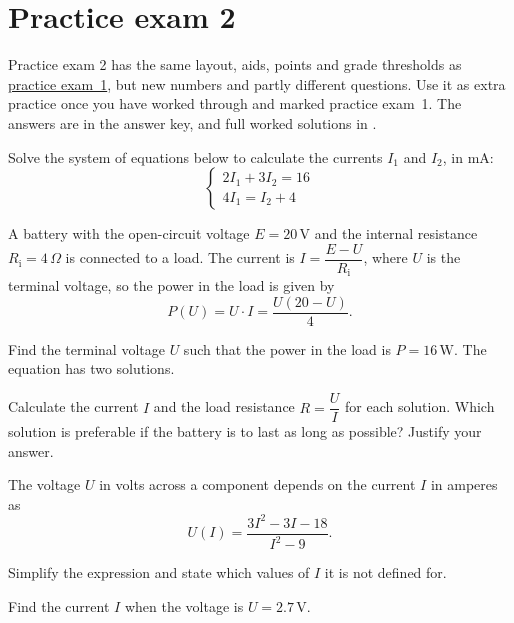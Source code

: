 
\section{Practice exam 2}
\label{c19:sec:ovningstentamen2}
Practice exam 2 has the same layout, aids, points and grade thresholds as
\hyperref[c19:sec:ovningstentamen]{practice exam~1}, but new numbers and partly different
questions. Use it as extra practice once you have worked through and marked practice exam~1. The
answers are in the answer key, and full worked solutions in .


Solve the system of equations below to calculate the currents $I_1$ and $I_2$, in mA:
\[
  \begin{cases}
    2I_1 + 3I_2 = 16 \\
    4I_1 = I_2 + 4
  \end{cases}
\]

A battery with the open-circuit voltage $E = 20\,\text{V}$ and the internal resistance
$R_{\text{i}} = 4\,\Omega$ is connected to a load. The current is
$I = \dfrac{E - U}{R_{\text{i}}}$, where $U$ is the terminal voltage, so the power in the load is
given by
\[
  P(U) = U \cdot I = \frac{U(20 - U)}{4}.
\]
\begin{parts}
  \item Find the terminal voltage $U$ such that the power in the load is $P = 16\,\text{W}$. The
    equation has two solutions.
  \item Calculate the current $I$ and the load resistance $R = \dfrac{U}{I}$ for each solution.
    Which solution is preferable if the battery is to last as long as possible? Justify your
    answer.
\end{parts}

The voltage $U$ in volts across a component depends on the current $I$ in amperes as
\[
  U(I) = \frac{3I^2 - 3I - 18}{I^2 - 9}.
\]
\begin{parts}
  \item Simplify the expression and state which values of $I$ it is not defined for.
  \item Find the current $I$ when the voltage is $U = 2.7\,\text{V}$.
\end{parts}

